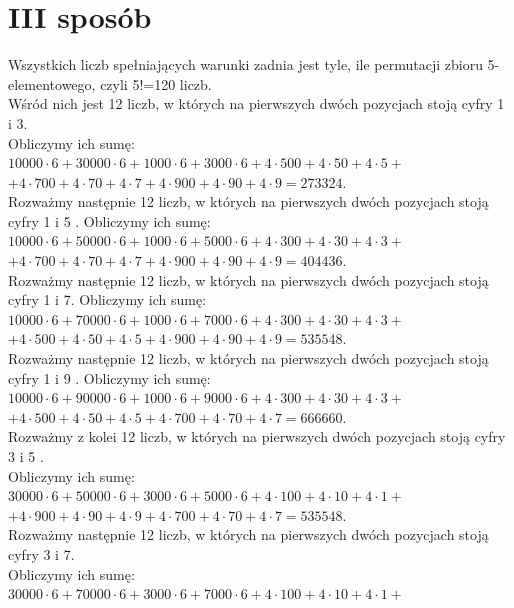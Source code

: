 \documentclass[10pt]{article}
\begin{document}
\section*{III sposób}
Wszystkich liczb spełniających warunki zadnia jest tyle, ile permutacji zbioru 5-elementowego, czyli 5!=120 liczb.\\
Wśród nich jest 12 liczb, w których na pierwszych dwóch pozycjach stoją cyfry 1 i 3.\\
Obliczymy ich sumę:\\
$10000 \cdot 6+30000 \cdot 6+1000 \cdot 6+3000 \cdot 6+4 \cdot 500+4 \cdot 50+4 \cdot 5+$\\
$+4 \cdot 700+4 \cdot 70+4 \cdot 7+4 \cdot 900+4 \cdot 90+4 \cdot 9=273324$.\\
Rozważmy następnie 12 liczb, w których na pierwszych dwóch pozycjach stoją cyfry 1 i 5 . Obliczymy ich sumę:\\
$10000 \cdot 6+50000 \cdot 6+1000 \cdot 6+5000 \cdot 6+4 \cdot 300+4 \cdot 30+4 \cdot 3+$\\
$+4 \cdot 700+4 \cdot 70+4 \cdot 7+4 \cdot 900+4 \cdot 90+4 \cdot 9=404436$.\\
Rozważmy następnie 12 liczb, w których na pierwszych dwóch pozycjach stoją cyfry 1 i 7. Obliczymy ich sumę:\\
$10000 \cdot 6+70000 \cdot 6+1000 \cdot 6+7000 \cdot 6+4 \cdot 300+4 \cdot 30+4 \cdot 3+$\\
$+4 \cdot 500+4 \cdot 50+4 \cdot 5+4 \cdot 900+4 \cdot 90+4 \cdot 9=535548$.\\
Rozważmy następnie 12 liczb, w których na pierwszych dwóch pozycjach stoją cyfry 1 i 9 . Obliczymy ich sumę:\\
$10000 \cdot 6+90000 \cdot 6+1000 \cdot 6+9000 \cdot 6+4 \cdot 300+4 \cdot 30+4 \cdot 3+$ $+4 \cdot 500+4 \cdot 50+4 \cdot 5+4 \cdot 700+4 \cdot 70+4 \cdot 7=666660$.\\
Rozważmy z kolei 12 liczb, w których na pierwszych dwóch pozycjach stoją cyfry 3 i 5 .\\
Obliczymy ich sumę:\\
$30000 \cdot 6+50000 \cdot 6+3000 \cdot 6+5000 \cdot 6+4 \cdot 100+4 \cdot 10+4 \cdot 1+$\\
$+4 \cdot 900+4 \cdot 90+4 \cdot 9+4 \cdot 700+4 \cdot 70+4 \cdot 7=535548$.\\
Rozważmy następnie 12 liczb, w których na pierwszych dwóch pozycjach stoją cyfry 3 i 7.\\
Obliczymy ich sumę:\\
$30000 \cdot 6+70000 \cdot 6+3000 \cdot 6+7000 \cdot 6+4 \cdot 100+4 \cdot 10+4 \cdot 1+$\\
\end{document}
